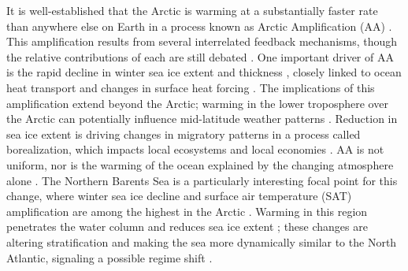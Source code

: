 \documentclass[draft]{agujournal2019}
\begin{document}
It is well-established that the Arctic is warming at a substantially faster rate than anywhere else on Earth in a process known as Arctic Amplification (AA) \cite{Manabe1980,Serreze2009,Cosimo2014,Huang2017,Rantanen2022}. This amplification results from several interrelated feedback mechanisms, though the relative contributions of each are still debated \cite{Pithan2014,Timmermans2018,Gong2017,Pistone2019,Previdi2021}. One important driver of AA is the rapid decline in winter sea ice extent and thickness \cite{Perovich2009,Dai2019}, closely linked to ocean heat transport and changes in surface heat forcing \cite{Onarheim2018,Stroeve2018,Oldenburg2024}. The implications of this amplification extend beyond the Arctic; warming in the lower troposphere over the Arctic can potentially influence mid-latitude weather patterns \cite{Honda2009,Petoukhov2010,Francis2012,Cohen2018,Coumou2018}. Reduction in sea ice extent is driving changes in migratory patterns in a process called borealization, which impacts local ecosystems and local economies \cite{Fossheim2015,Polyakov2020_borealization,Ingvaldsen2021}. AA is not uniform, nor is the warming of the ocean explained by the changing atmosphere alone \cite{Marshall2014}. The Northern Barents Sea is a particularly interesting focal point for this change, where winter sea ice decline and surface air temperature (SAT) amplification are among the highest in the Arctic \cite{Screen2010,Onarheim2017,Isaksen2022,Rantanen2022}. Warming in this region penetrates the water column \cite{Smedsrud2013} and reduces sea ice extent \cite{Onarheim2018,Previdi2021}; these changes are altering stratification and making the sea more dynamically similar to the North Atlantic, signaling a possible regime shift \cite{Arthun2012,Lind2018,Skagseth2020}.
\end{document}
